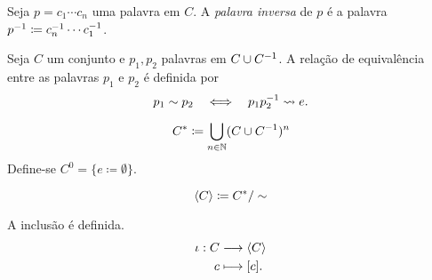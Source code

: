 Seja $p=c_1 \cdots c_n$ uma palavra em $C$. A \emph{palavra inversa} de $p$ é a palavra $p^{-1} \coloneqq c_n^{-1} \cdots c_1^{-1}$.

\begin{defi}
Seja $C$ um conjunto e $p_1,p_2 $ palavras em $C \cup C^{-1}$. A relação de equivalência entre as palavras $p_1$ e $p_2$ é definida por
	\begin{equation*}
	p_1 \sim p_2 \quad \Longleftrightarrow \quad p_1p_2^{-1} \leadsto e.
	\end{equation*}	
\end{defi}

	\begin{equation*}
	C^* \coloneqq \bigcup_{n \in \mathbb{N}} (C \cup C^{-1})^n
	\end{equation*}
 Define-se $C^0 = \{e\coloneqq \emptyset\}$.

	\begin{equation*}
	\left\langle C \right\rangle \coloneqq C^*/\sim
	\end{equation*}
	
	A inclusão é definida.
	\begin{align*}
	{\iota}: {C} &\longrightarrow {\left\langle C \right\rangle} \\{c} &\longmapsto {[c]}.
	\end{align*}

